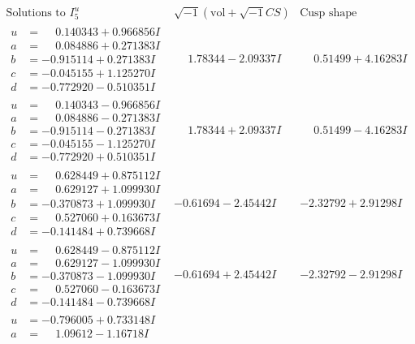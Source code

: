 \documentclass[1p]{elsarticle_modified}
\theoremstyle{definition}
\newcommand{\I}{\sqrt{-1}}
\begin{document}
$$\begin{array}{c|c|c}  
\text{Solutions to }I^u_{5}& \I (\text{vol} + \sqrt{-1}CS) & \text{Cusp shape}\\
 \hline 
\begin{aligned}
u &= \phantom{-}0.140343 + 0.966856 I \\
a &= \phantom{-}0.084886 + 0.271383 I \\
b &= -0.915114 + 0.271383 I \\
c &= -0.045155 + 1.125270 I \\
d &= -0.772920 - 0.510351 I\end{aligned}
 & \phantom{-}1.78344 - 2.09337 I & \phantom{-}0.51499 + 4.16283 I \\ \hline\begin{aligned}
u &= \phantom{-}0.140343 - 0.966856 I \\
a &= \phantom{-}0.084886 - 0.271383 I \\
b &= -0.915114 - 0.271383 I \\
c &= -0.045155 - 1.125270 I \\
d &= -0.772920 + 0.510351 I\end{aligned}
 & \phantom{-}1.78344 + 2.09337 I & \phantom{-}0.51499 - 4.16283 I \\ \hline\begin{aligned}
u &= \phantom{-}0.628449 + 0.875112 I \\
a &= \phantom{-}0.629127 + 1.099930 I \\
b &= -0.370873 + 1.099930 I \\
c &= \phantom{-}0.527060 + 0.163673 I \\
d &= -0.141484 + 0.739668 I\end{aligned}
 & -0.61694 - 2.45442 I & -2.32792 + 2.91298 I \\ \hline\begin{aligned}
u &= \phantom{-}0.628449 - 0.875112 I \\
a &= \phantom{-}0.629127 - 1.099930 I \\
b &= -0.370873 - 1.099930 I \\
c &= \phantom{-}0.527060 - 0.163673 I \\
d &= -0.141484 - 0.739668 I\end{aligned}
 & -0.61694 + 2.45442 I & -2.32792 - 2.91298 I \\ \hline\begin{aligned}
u &= -0.796005 + 0.733148 I \\
a &= \phantom{-}1.09612 - 1.16718 I \\

\end{aligned}
\end{array}$$
\end{document}
